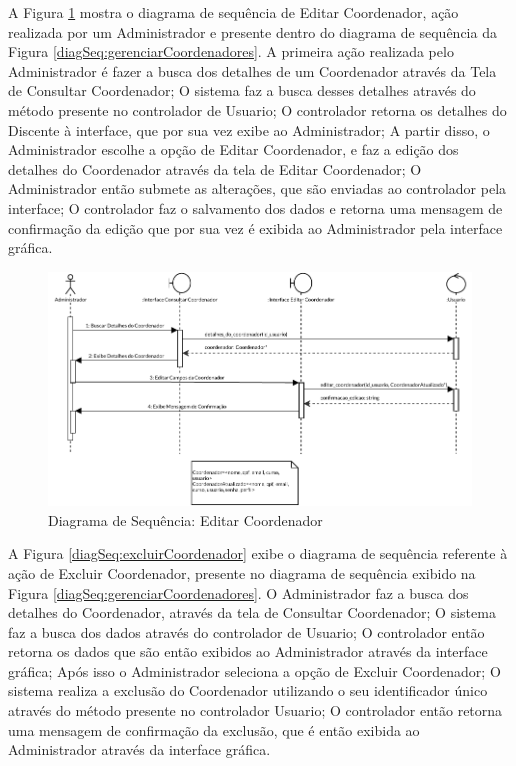 A Figura \ref{diagSeq:editarCoordenador} mostra o diagrama de sequência de Editar Coordenador, ação realizada por um Administrador e presente dentro do diagrama de sequência da Figura \ref{diagSeq:gerenciarCoordenadores}. A primeira ação realizada pelo Administrador é fazer a busca dos detalhes de um Coordenador através da Tela de Consultar Coordenador; O sistema faz a busca desses detalhes através do método presente no controlador de Usuario; O controlador retorna os detalhes do Discente à interface, que por sua vez exibe ao Administrador; A partir disso, o Administrador escolhe a opção de Editar Coordenador, e faz a edição dos detalhes do Coordenador através da tela de Editar Coordenador; O Administrador então submete as alterações, que são enviadas ao controlador pela interface; O controlador faz o salvamento dos dados e retorna uma mensagem de confirmação da edição que por sua vez é exibida ao Administrador pela interface gráfica.

\begin{figure}[H]
    \centering
    \includegraphics[width=\textwidth]{dados/figuras/Proposta/DiagramasDeSequencia/Gerenciar Coodenadores-Atualizar Coordenador.pdf}
    \caption{Diagrama de Sequência: Editar Coordenador}
    \label{diagSeq:editarCoordenador}
\end{figure}

A Figura \ref{diagSeq:excluirCoordenador} exibe o diagrama de sequência referente à ação de Excluir Coordenador, presente no diagrama de sequência exibido na Figura \ref{diagSeq:gerenciarCoordenadores}. O Administrador faz a busca dos detalhes do Coordenador, através da tela de Consultar Coordenador; O sistema faz a busca dos dados através do controlador de Usuario; O controlador então retorna os dados que são então exibidos ao Administrador através da interface gráfica; Após isso o Administrador seleciona a opção de Excluir Coordenador; O sistema realiza a exclusão do Coordenador utilizando o seu identificador único através do método presente no controlador Usuario; O controlador então retorna uma mensagem de confirmação da exclusão, que é então exibida ao Administrador através da interface gráfica.

